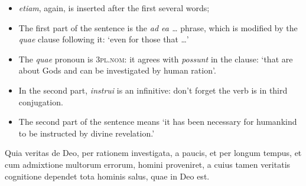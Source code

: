 \documentclass[a4paper, 12pt]{article}
\newcommand{\form}[1]{\emph{#1}}
\newcommand*{\category}[1]{\textsc{#1}}
\newcommand{\translate}[1]{`#1'}
\begin{document}
\begin{itemize}
    \item \emph{etiam}, again, is inserted after the first several words;  
    \item The first part of the sentence is the \form{ad ea \dots} phrase,
    which is modified by the \form{quae} clause following it:
    \translate{even for those that \dots}
    \item The \form{quae} pronoun is \category{3pl.nom}: 
    it agrees with \form{possunt} in the clause: 
    \translate{that are about Gods and can be investigated by human ration}.
    \item In the second part, \form{instrui} is an infinitive: 
    don't forget the verb is in third conjugation.
    \item The second part of the sentence means 
    \translate{it has been necessary for humankind to be instructed by divine revelation.}
\end{itemize}

\begin{exe}
    \ex Quia veritas de Deo, per rationem investigata, a paucis, et per longum tempus, et cum admixtione multorum errorum, homini proveniret, a cuius tamen veritatis cognitione dependet tota hominis salus, quae in Deo est. 
\end{exe}
\end{document}
